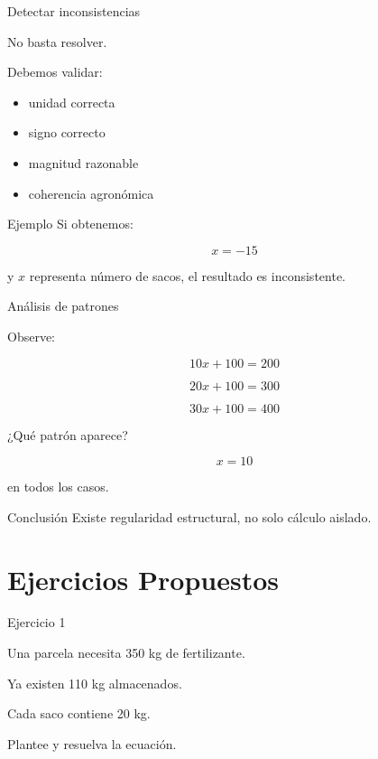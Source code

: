 \documentclass[aspectratio=169]{beamer}
\begin{document}
	\begin{frame}{Detectar inconsistencias}
		
		No basta resolver.
		
		Debemos validar:
		
		\begin{itemize}
			\item unidad correcta
			\item signo correcto
			\item magnitud razonable
			\item coherencia agronómica
		\end{itemize}
		
		\begin{block}{Ejemplo}
			Si obtenemos:
			
			\[
			x=-15
			\]
			
			y \(x\) representa número de sacos,
			el resultado es inconsistente.
		\end{block}
		
	\end{frame}
	
	\begin{frame}{Análisis de patrones}
		
		Observe:
		
		\[
		10x+100=200
		\]
		
		\[
		20x+100=300
		\]
		
		\[
		30x+100=400
		\]
		
		\pause
		
		¿Qué patrón aparece?
		
		\pause
		
		\[
		x=10
		\]
		
		en todos los casos.
		
		\begin{block}{Conclusión}
			Existe regularidad estructural,
			no solo cálculo aislado.
		\end{block}
		
	\end{frame}
	
	\section{Ejercicios Propuestos}
	
	\begin{frame}{Ejercicio 1}
		
		Una parcela necesita 350 kg de fertilizante.
		
		Ya existen 110 kg almacenados.
		
		Cada saco contiene 20 kg.
		
		Plantee y resuelva la ecuación.
		
	\end{frame}
	
\end{document}
